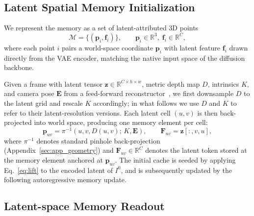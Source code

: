 \subsection{Latent Spatial Memory Initialization}
\label{sec:method:mem}


We represent the memory as a set of latent-attributed 3D points
\begin{equation}
\mathcal{M} = \bigl\{(\mathbf{p}_i, \mathbf{f}_i)\bigr\},
\qquad \mathbf{p}_i \in \mathbb{R}^{3},\; \mathbf{f}_i \in \mathbb{R}^{C},
\label{eq:lat-mem}
\end{equation}
where each point $i$ pairs a world-space coordinate $\mathbf{p}_i$ with
latent feature $\mathbf{f}_i$ drawn directly from the VAE encoder, matching the native
input space of the diffusion backbone.






Given a frame with latent tensor $\mathbf{z} \in \mathbb{R}^{C \times h \times w}$,
metric depth map $D$, intrinsics $K$, and camera pose $\mathbf{E}$
from a feed-forward reconstructor~\cite{lin2025depth}, we first
downsample $D$ to the latent grid and rescale $K$ accordingly; in what
follows we use $D$ and $K$ to refer to their latent-resolution versions.
Each latent cell $(u,v)$ is then back-projected into world space,
producing one memory element per cell:
\begin{equation}
\mathbf{p}_{uv} = \pi^{-1}(u, v, D(u,v);\, K, \mathbf{E}), \qquad \mathbf{F}_{uv} = \mathbf{z}[:, v, u],
\label{eq:lift}
\end{equation}
where $\pi^{-1}$ denotes standard pinhole back-projection
(Appendix~\ref{sec:app_geometry}) and $\mathbf{F}_{uv}\in \mathbb{R}^C$ denotes the latent token stored at the memory element anchored at $\mathbf{p}_{uv}$.
The initial cache is seeded by applying Eq.~\ref{eq:lift} to the
encoded latent of $I^0$, and is subsequently updated by the following autoregressive memory update.





\subsection{Latent-space Memory Readout}
\label{sec:method:read}

